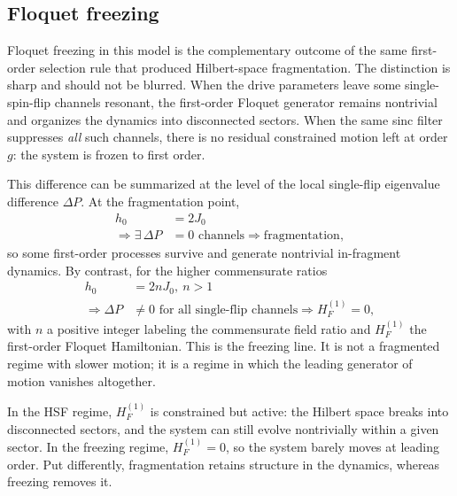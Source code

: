 \documentclass[aps,prb,reprint,twocolumn,amsmath,amssymb,citeautoscript]{revtex4-2}
\begin{document}
\subsection{Floquet freezing}
\label{sec:freezing}

Floquet freezing in this model is the complementary outcome of the same first-order selection rule that produced Hilbert-space fragmentation. The distinction is sharp and should not be blurred. When the drive parameters leave some single-spin-flip channels resonant, the first-order Floquet generator remains nontrivial and organizes the dynamics into disconnected sectors. When the same sinc filter suppresses \textit{all} such channels, there is no residual constrained motion left at order $g$: the system is frozen to first order.

This difference can be summarized at the level of the local single-flip eigenvalue difference $\Delta P$. At the fragmentation point,
\begin{equation}
\begin{aligned}
   h_0&=2J_0
\\
 \Longrightarrow \exists\, \Delta P &= 0 \text{ channels}
\Longrightarrow 
\text{fragmentation}, 
\end{aligned}
\label{eq:fragmentation_vs_freezing_a}
\end{equation}
so some first-order processes survive and generate nontrivial in-fragment dynamics. By contrast, for the higher commensurate ratios
\begin{equation}
\begin{aligned}
    h_0&=2nJ_0,~ n>1 \\
\Longrightarrow 
\Delta P &\neq 0 \text{ for all single-flip channels}
\Longrightarrow
H_F^{(1)}=0,
\end{aligned}
\label{eq:fragmentation_vs_freezing_b}
\end{equation}
with $n$ a positive integer labeling the commensurate field ratio and $H_F^{(1)}$ the first-order Floquet Hamiltonian. This is the freezing line. It is not a fragmented regime with slower motion; it is a regime in which the leading generator of motion vanishes altogether.

 In the HSF regime, $H_F^{(1)}$ is constrained but active: the Hilbert space breaks into disconnected sectors, and the system can still evolve nontrivially within a given sector. In the freezing regime, $H_F^{(1)}=0$, so the system barely moves at leading order. Put differently, fragmentation retains structure in the dynamics, whereas freezing removes it.
\end{document}
